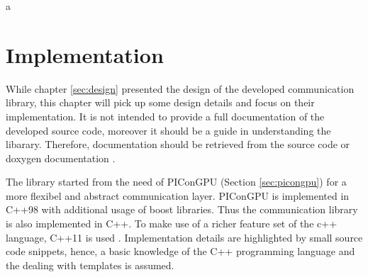 a\chapter{Implementation}
\label{sec:implementation}



While chapter \ref{sec:design} presented the design of the developed
communication library, this chapter will pick up some design details
and focus on their implementation.  It is not intended to provide a
full documentation of the developed source code, moreover it should be
a guide in understanding the libarary. Therefore, documentation should
be retrieved from the source code or doxygen documentation
\cite{ref:doxygen}.

The library started from the need of PIConGPU (Section
\ref{sec:picongpu}) for a more flexibel and abstract communication
layer. PIConGPU is implemented in C++98 with additional usage of boost
\cite{ref:boost} libraries. Thus the communication library is also
implemented in C++. To make use of a richer feature set of the c++
language, C++11 is used \cite{ref:c++11}. Implementation details are
highlighted by small source code snippets, hence, a basic knowledge of
the C++ programming language and the dealing with templates is
assumed.

